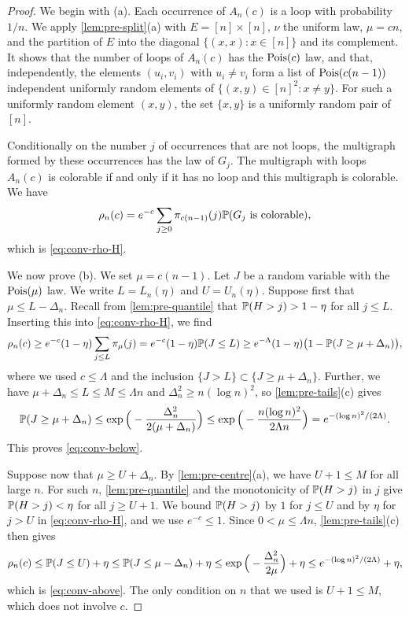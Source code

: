 \begin{proof}
We begin with (a). Each occurrence of $A_n(c)$ is a loop with probability $1/n$. We apply \cref{lem:pre-split}(a) with $E = [n] \times [n]$, $\nu$ the uniform law, $\mu = cn$, and the partition of $E$ into the diagonal $\{(x, x) : x \in [n]\}$ and its complement. It shows that the number of loops of $A_n(c)$ has the $\operatorname{Pois}(c)$ law, and that, independently, the elements $(u_i, v_i)$ with $u_i \neq v_i$ form a list of $\operatorname{Pois}(c(n - 1))$ independent uniformly random elements of $\{(x, y) \in [n]^2 : x \neq y\}$. For such a uniformly random element $(x, y)$, the set $\{x, y\}$ is a uniformly random pair of $[n]$.

Conditionally on the number $j$ of occurrences that are not loops, the multigraph formed by these occurrences has the law of $G_j$. The multigraph with loops $A_n(c)$ is colorable if and only if it has no loop and this multigraph is colorable. We have
\[
\rho_n(c) = e^{-c} \sum_{j \ge 0} \pi_{c(n - 1)}(j) \mathbb P(G_j \text{ is colorable}),
\]
which is \eqref{eq:conv-rho-H}.

We now prove (b). We set $\mu = c(n - 1)$. Let $J$ be a random variable with the $\operatorname{Pois}(\mu)$ law. We write $L = L_n(\eta)$ and $U = U_n(\eta)$. Suppose first that $\mu \le L - \Delta_n$. Recall from \cref{lem:pre-quantile} that $\mathbb P(H > j) > 1 - \eta$ for all $j \le L$. Inserting this into \eqref{eq:conv-rho-H}, we find
\[
\rho_n(c) \ge e^{-c} (1 - \eta) \sum_{j \le L} \pi_\mu(j) = e^{-c} (1 - \eta) \mathbb P(J \le L) \ge e^{-\Lambda} (1 - \eta) \big(1 - \mathbb P(J \ge \mu + \Delta_n)\big),
\]
where we used $c \le \Lambda$ and the inclusion $\{J > L\} \subset \{J \ge \mu + \Delta_n\}$. Further, we have $\mu + \Delta_n \le L \le M \le \Lambda n$ and $\Delta_n^2 \ge n (\log n)^2$, so \cref{lem:pre-tails}(c) gives
\[
\mathbb P(J \ge \mu + \Delta_n) \le \exp\Big(-\frac{\Delta_n^2}{2(\mu + \Delta_n)}\Big) \le \exp\Big(-\frac{n (\log n)^2}{2\Lambda n}\Big) = e^{-(\log n)^2/(2\Lambda)}.
\]
This proves \eqref{eq:conv-below}.

Suppose now that $\mu \ge U + \Delta_n$. By \cref{lem:pre-centre}(a), we have $U + 1 \le M$ for all large $n$. For such $n$, \cref{lem:pre-quantile} and the monotonicity of $\mathbb P(H > j)$ in $j$ give $\mathbb P(H > j) < \eta$ for all $j \ge U + 1$. We bound $\mathbb P(H > j)$ by $1$ for $j \le U$ and by $\eta$ for $j > U$ in \eqref{eq:conv-rho-H}, and we use $e^{-c} \le 1$. Since $0 < \mu \le \Lambda n$, \cref{lem:pre-tails}(c) then gives
\[
\rho_n(c) \le \mathbb P(J \le U) + \eta \le \mathbb P(J \le \mu - \Delta_n) + \eta \le \exp\Big(-\frac{\Delta_n^2}{2\mu}\Big) + \eta \le e^{-(\log n)^2/(2\Lambda)} + \eta,
\]
which is \eqref{eq:conv-above}. The only condition on $n$ that we used is $U + 1 \le M$, which does not involve $c$.
\end{proof}

